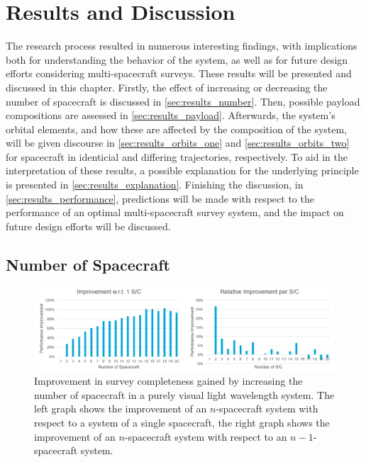 \chapter{Results and Discussion}
\label{ch:results}
The research process resulted in numerous interesting findings, with implications both for understanding the behavior of the system, as well as for future design efforts considering multi-spacecraft surveys. These results will be presented and discussed in this chapter. Firstly, the effect of increasing or decreasing the number of spacecraft is discussed in \autoref{sec:results_number}. Then, possible payload compositions are assessed in \autoref{sec:results_payload}. Afterwards, the system's orbital elements, and how these are affected by the composition of the system, will be given discourse in \autoref{sec:results_orbits_one} and \autoref{sec:results_orbits_two} for spacecraft in identicial and differing trajectories, respectively. To aid in the interpretation of these results, a possible explanation for the underlying principle is presented in \autoref{sec:results_explanation}. Finishing the discussion, in \autoref{sec:results_performance}, predictions will be made with respect to the performance of an optimal multi-spacecraft survey system, and the impact on future design efforts will be discussed.

\section{Number of Spacecraft}
\label{sec:results_number}

\begin{figure}[htbp]
 \centering
 \includegraphics[width=1.0\textwidth]{img/number_sc_vis.png}
 \caption{Improvement in survey completeness gained by increasing the number of spacecraft in a purely visual light wavelength system. The left graph shows the improvement of an $n$-spacecraft system with respect to a system of a single spacecraft, the right graph shows the improvement of an $n$-spacecraft system with respect to an $n-1$-spacecraft system.}
 \label{fig:results_number_vis}
\end{figure}


